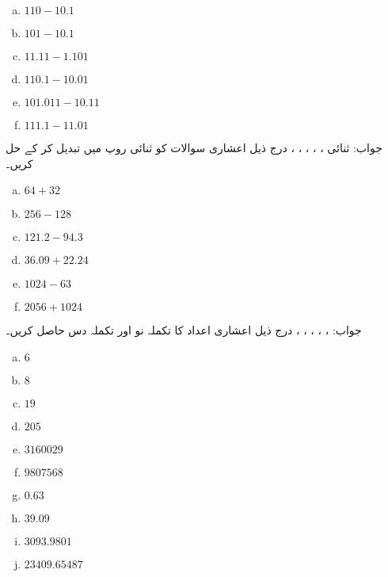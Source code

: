 \begin{multicols}{4}
\begin{enumerate}[a.]
\item  
 \(110-10.1\)  
\item 
 \(101-10.1\) 

\item  
 \(11.11-1.101\)  
\item 
 \(110.1-10.01\)   

\item  
 \(101.011-10.11\) 
\item 
 \(111.1-11.01\)
\end{enumerate}
\end{multicols}
جواب: ثنائی  ، ، ، ، ، 
درج ذیل اعشاری سوالات کو ثنائی روپ میں تبدیل کر کے حل کریں۔
\begin{multicols}{4}
\begin{enumerate}[a.]

\item  
 \(64+32\)  
\item  
 \(256-128\) 
\item  
 \(121.2-94.3\) 
\item  
 \(36.09+22.24\)  
\item  
 \(1024-63\) 
\item  
 \(2056+1024\)    
\end{enumerate}
\end{multicols}
جواب:  ، ، ، ، ، 
درج ذیل اعشاری اعداد کا تکملہ نو اور تکملہ دس حاصل کریں۔
\begin{multicols}{4}
\begin{enumerate}[a.]
\item  
 \(6\)  
\item   
 \(8\) 
\item  
 \(19\)  
\item   
 \(205\) 
\item  
 \(3160029\) 
\item   
 \(9807568\) 
\item  
 \(0.63\)  
\item   
 \(39.09\) 
\item  
 \(3093.9801\) 
\item   
 \(23409.65487\) 
\end{enumerate}
\end{multicols}
